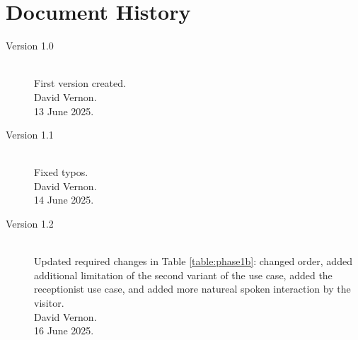 \documentclass{CSSRforAfrica}
\begin{document}
\newpage
\section*{Document History}
\label{document_history}

\begin{description}

\item [Version 1.0]~\\
First version created. \\
David Vernon.\\
13 June 2025.   \\               
 
\item [Version 1.1]~\\
Fixed typos. \\
David Vernon.\\
14 June 2025.   \\  

\item [Version 1.2]~\\
Updated required changes in Table \ref{table:phase1b}: changed order, added additional limitation of the second variant of the use case, added the receptionist use case, and added more natureal spoken interaction by the visitor.\\
David Vernon.\\
16 June 2025.   \\  


\end{description}
\end{document}
